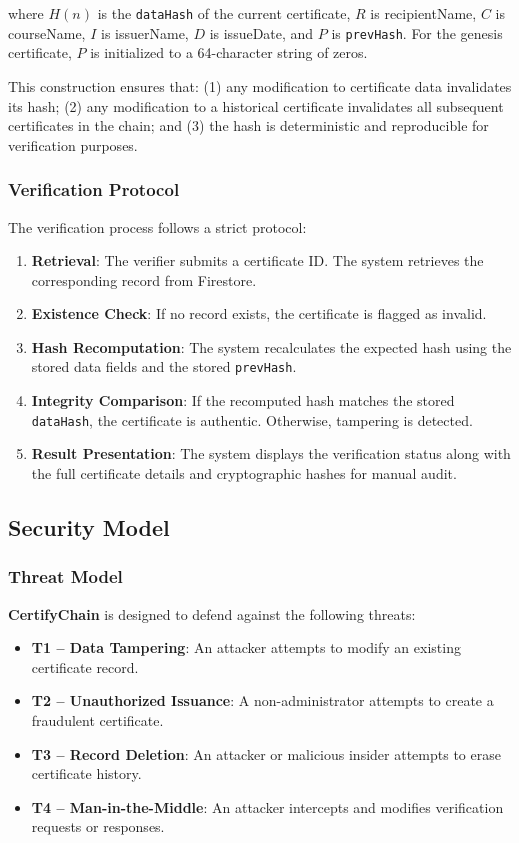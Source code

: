 \documentclass[10pt,twocolumn,a4paper]{article}
\newcommand{\certifychain}{\textbf{CertifyChain}}
\begin{document}
where $H(n)$ is the \texttt{dataHash} of the current certificate, $R$ is recipientName, $C$ is courseName, $I$ is issuerName, $D$ is issueDate, and $P$ is \texttt{prevHash}. For the genesis certificate, $P$ is initialized to a 64-character string of zeros.

This construction ensures that: (1) any modification to certificate data invalidates its hash; (2) any modification to a historical certificate invalidates all subsequent certificates in the chain; and (3) the hash is deterministic and reproducible for verification purposes.

\subsubsection{Verification Protocol}

The verification process follows a strict protocol:

\begin{enumerate}
    \item \textbf{Retrieval}: The verifier submits a certificate ID. The system retrieves the corresponding record from Firestore.
    \item \textbf{Existence Check}: If no record exists, the certificate is flagged as invalid.
    \item \textbf{Hash Recomputation}: The system recalculates the expected hash using the stored data fields and the stored \texttt{prevHash}.
    \item \textbf{Integrity Comparison}: If the recomputed hash matches the stored \texttt{dataHash}, the certificate is authentic. Otherwise, tampering is detected.
    \item \textbf{Result Presentation}: The system displays the verification status along with the full certificate details and cryptographic hashes for manual audit.
\end{enumerate}

\subsection{Security Model}

\subsubsection{Threat Model}

\certifychain{} is designed to defend against the following threats:

\begin{itemize}
    \item \textbf{T1 -- Data Tampering}: An attacker attempts to modify an existing certificate record.
    \item \textbf{T2 -- Unauthorized Issuance}: A non-administrator attempts to create a fraudulent certificate.
    \item \textbf{T3 -- Record Deletion}: An attacker or malicious insider attempts to erase certificate history.
    \item \textbf{T4 -- Man-in-the-Middle}: An attacker intercepts and modifies verification requests or responses.
\end{itemize}
\end{document}
